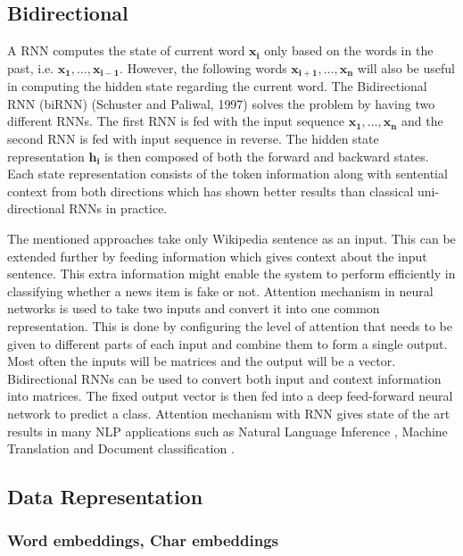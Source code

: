 \documentclass[a4paper, 11pt]{article}
\begin{document}
\subsection{Bidirectional}
A RNN computes the state of current word $\mathbf{x_{i}}$ only based on the words in the past, i.e. $\mathrm{\mathbf{x_1},\dots,\mathbf{x_{i-1}}}$. However, the following words $\mathrm{\mathbf{x_{i+1}},\dots,\mathbf{x_{n}}}$ will also be useful in computing the hidden state regarding the current word. The Bidirectional RNN (biRNN) (Schuster and Paliwal, 1997) solves the problem by having two different RNNs. The first RNN is fed with the input sequence $\mathrm{\mathbf{x_{1}},\dots,\mathbf{x_{n}}}$ and the second RNN is fed with input sequence in reverse. The hidden state representation $\mathbf{h_{i}}$ is then composed of both the forward and backward states. Each state representation consists of the token information along with sentential context from both directions which has shown better results than classical uni-directional RNNs in practice.

The mentioned approaches take only Wikipedia sentence as an input. This can be extended further by feeding information which gives context about the input sentence. This extra information might enable the system to perform efficiently in classifying whether a news item is fake or not. Attention mechanism in neural networks is used to take two inputs and convert it into one common representation. This is done by configuring the level of attention that needs to be given to different parts of each input and combine them to form a single output. Most often the inputs will be matrices and the output will be a vector. Bidirectional RNNs can be used to convert both input and context information into matrices. The fixed output vector is then fed into a deep feed-forward neural network to predict a class. Attention mechanism with RNN gives state of the art results in many NLP applications such as Natural Language Inference \parencite{Parikh2016}, Machine Translation \parencite{Bahdanau2014} and Document classification \parencite{Yang2016}.

\subsection{Data Representation}

\subsubsection{Word embeddings, Char embeddings}
\end{document}
